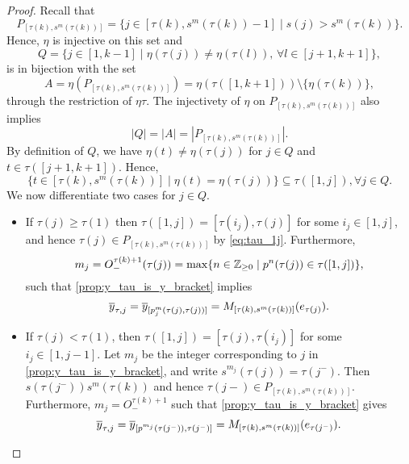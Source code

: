 \begin{proof}
	Recall that
	\begin{equation*}
		P_{[\tau(k), s^m(\tau(k))]} = \{j \in [\tau(k), s^m(\tau(k)) -1] \mid s(j) > s^m(\tau(k))\}.
	\end{equation*}
	Hence, $\eta$ is injective on this set and
	\begin{equation*}
		Q = \{j \in [1, k-1] \mid \eta(\tau(j)) \neq \eta(\tau(l)),\, \forall l \in [j+1, k+1]\},
	\end{equation*}
	is in bijection with the set
	\begin{equation*}
		A = \eta(P_{[\tau(k), s^m(\tau(k))]}) = \eta(\tau([1, k+1])) \setminus \{\eta(\tau(k))\},
	\end{equation*}
	through the restriction of $\eta \tau$. The injectivety of $\eta$ on $P_{[\tau(k),
						s^m(\tau(k))]}$ also implies
	\begin{equation*}
		|Q| = |A| = |P_{[\tau(k), s^m(\tau(k))]}|.
	\end{equation*}
	By definition of $Q$, we have $\eta(t) \neq \eta(\tau(j))$ for $j \in Q$ and $t \in
		\tau([j+1, k +1])$. Hence,
	\begin{equation}\label{eq:tau_1j}
		\{t \in [\tau(k), s^m(\tau(k))] \mid \eta(t) = \eta(\tau(j))\} \subseteq \tau([1, j]), \forall j \in Q.
	\end{equation}
	We now differentiate two cases for $j \in Q$.
	\begin{itemize}
		\item If $\tau(j) \geq \tau(1)$ then $\tau([1, j]) = [\tau(i_j), \tau(j)]$ for some $i_j \in
			      [1, j]$, and hence $\tau(j) \in P_{[\tau(k), s^m(\tau(k))]}$ by \cref{eq:tau_1j}.
		      Furthermore,
		      \begin{equation*}
			      m_j = O_{-}^{\tau(k) + 1}(\tau(j)) = \max\{n \in \mathbb{Z}_{\geq 0} \mid p^n (\tau(j)) \in \tau([1, j])\},
		      \end{equation*}
		      such that \cref{prop:y_tau_is_y_bracket} implies
		      \begin{equation*}
			      \overline{y}_{\tau, j} = \overline{y}_{[p^m_j(\tau(j), \tau(j))]} = M_{[\tau(k), s^m(\tau(k))]}(e_{\tau(j)}).
		      \end{equation*}
		\item If $\tau(j) < \tau(1)$, then $\tau([1, j]) = [\tau(j), \tau(i_j)]$ for some $i_j \in
			      [1, j-1]$. Let $m_j$ be the integer corresponding to $j$ in
		      \cref{prop:y_tau_is_y_bracket}, and write $s^{m_j}(\tau(j)) = \tau(j^{-})$. Then
		      $s(\tau(j^{-})) s^m(\tau(k))$ and hence $\tau(j-) \in P_{[\tau(k), s^m(\tau(k))]}$.
		      Furthermore, $m_j = O_{-}^{\tau(k) + 1}$ such that \cref{prop:y_tau_is_y_bracket} gives
		      \begin{equation*}
			      \overline{y}_{\tau, j} = \overline{y}_{[p^{m_j}(\tau(j^{-})), \tau(j^{-})]} = M_{[\tau(k), s^m(\tau(k))]}(e_{\tau(j^{-})}).
		      \end{equation*}
	\end{itemize}


\end{proof}
